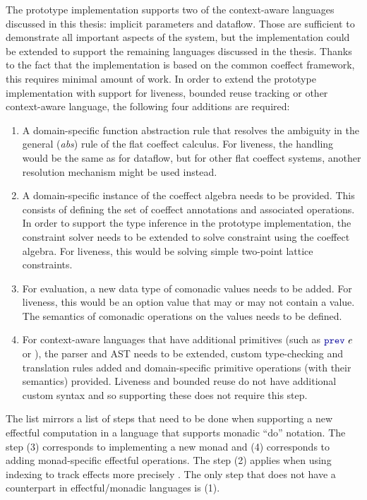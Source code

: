The prototype implementation supports two of the context-aware languages discussed in this thesis:
implicit parameters and dataflow. Those are sufficient to demonstrate all important aspects of the
system, but the implementation could be extended to support the remaining languages discussed in
the thesis. Thanks to the fact that the implementation is based on the common coeffect framework,
this requires minimal amount of work. In order to extend the prototype implementation with support
for liveness, bounded reuse tracking or other context-aware language, the following four additions
are required:

\begin{enumerate}
\item A domain-specific function abstraction rule that resolves the ambiguity in the general
  (\emph{abs}) rule of the flat coeffect calculus. For liveness, the handling would be the same
  as for dataflow, but for other flat coeffect systems, another resolution mechanism might be used
  instead.

\item A domain-specific instance of the coeffect algebra needs to be provided. This consists of
  defining the set of coeffect annotations and associated operations. In order to support
  the type inference in the prototype implementation, the constraint solver needs to be extended
  to solve constraint using the coeffect algebra. For liveness, this would be solving simple
  two-point lattice constraints.

\item For evaluation, a new data type of comonadic values needs to be added. For liveness, this would
  be an option value that may or may not contain a value. The semantics of comonadic operations on the
  values needs to be defined.

\item For context-aware languages that have additional primitives (such as $\kvd{prev}~e$ or ),
  the parser and AST needs to be extended, custom type-checking and translation rules added and
  domain-specific primitive operations (with their semantics) provided. Liveness and bounded reuse
  do not have additional custom syntax and so supporting these does not require this step.
\end{enumerate}

\noindent
The list mirrors a list of steps that need to be done when supporting a new effectful computation
in a language that supports monadic ``do'' notation. The step (3) corresponds to implementing a new
monad and (4) corresponds to adding monad-specific effectful operations. The step (2) applies when
using indexing to track effects more precisely \cite{effects-embedding}. The only step that does not
have a counterpart in effectful/monadic languages is (1).

